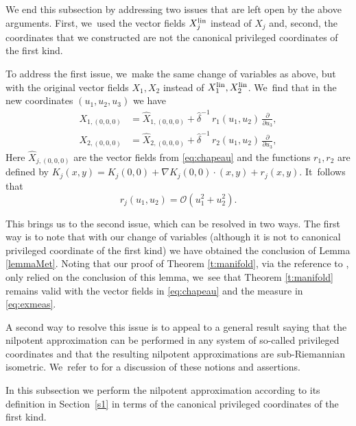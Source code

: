 \documentclass[10pt]{amsart}
\newcommand{\lin}{\textup{lin}}
\theoremstyle{definition}
\newcommand{\1}{\mathbbm{1}}
\begin{document}
We end this subsection by addressing two issues that are left open by the above arguments. First, we~used the vector fields $X_j^\lin$ instead of $X_j$ and, second, the coordinates that we constructed are not the canonical privileged coordinates of the first kind.

To address the first issue, we~make the same change of variables as above, but with the original vector fields $X_1,X_2$ instead of $X_1^\lin,X_2^\lin$. We~find that in the new coordinates $(u_1,u_2,u_3)$ we have
\begin{align*}
X_{1,(0,0,0)} & = \widehat X_{1,(0,0,0)} + \widehat\delta^{-1} \,r_1(u_1,u_2) \,\frac{\partial}{\partial u_3},\\
X_{2,(0,0,0)} & = \widehat X_{2,(0,0,0)} + \widehat\delta^{-1} \,r_2(u_1,u_2) \,\frac{\partial}{\partial u_3},
\end{align*}
Here $\widehat X_{j,(0,0,0)}$ are the vector fields from \eqref{eq:chapeau} and the functions $r_1,r_2$ are defined by $K_j(x,y)= K_j(0,0) + \nabla K_j(0,0) \cdot (x, y) + r_{j} (x,y)$. It~follows that
\[
r_{j}(u_1,u_2) = \mathcal O (u_1^2 + u_2^2).
\]

This brings us to the second issue, which can be resolved in two ways. The first way is to note that with our change of variables (although it is not to canonical privileged coordinate of the first kind) we have obtained the conclusion of Lemma \ref{lemmaMet}. Noting that our proof of Theorem \ref{t:manifold}, via the reference to \cite{Rot}, only relied on the conclusion of this lemma, we~see that Theorem \ref{t:manifold} remains valid with the vector fields in \eqref{eq:chapeau} and the measure in \eqref{eq:exmeas}.

A second way to resolve this issue is to appeal to a general result saying that the nilpotent approximation can be performed in any system of so-called privileged coordinates and that the resulting nilpotent approximations are sub-Riemannian isometric. We~refer to \cite[\S A.5.4]{CHT1} for a discussion of these notions and assertions.

In this subsection we perform the nilpotent approximation according to its definition in Section~\ref{s1} in terms of the canonical privileged coordinates of the first kind.
\end{document}
